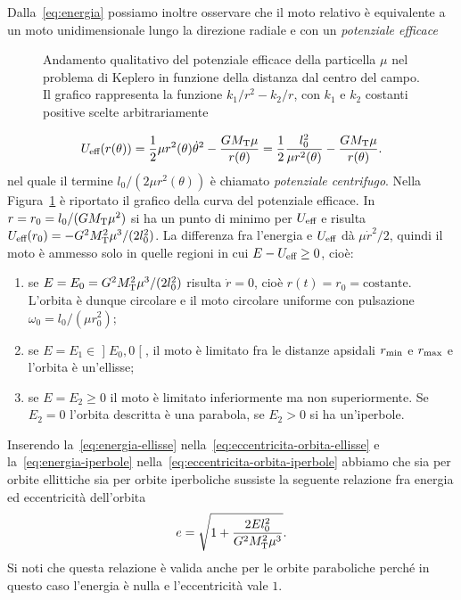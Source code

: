 {Dalla~\eqref{eq:energia} possiamo inoltre osservare che il moto relativo è
equivalente a un moto unidimensionale lungo la direzione radiale e con un
\emph{potenziale efficace}
\begin{figure} %
  \centering
  
  \caption[Andamento del potenziale efficace in funzione della distanza dal
  centro del campo]{Andamento qualitativo del potenziale efficace della
    particella $\mu$ nel problema di Keplero in funzione della distanza dal
    centro del campo. Il grafico rappresenta la funzione $k_1/r^2-k_2/r$, con
    $k_1$ e $k_2$ costanti positive scelte arbitrariamente}
  \label{fig:potenziale-efficace}
\end{figure}
\begin{equation}
  U_\textup{eff}(r(\theta)) = \frac{1}{2}\mu r^2(\theta)\dot{\theta}^2 -
  \frac{GM_\textup{T}\mu}{r(\theta)} = \frac{1}{2}\frac{l_0^2}{\mu r^2(\theta)} -
  \frac{GM_\textup{T}\mu}{r(\theta)}.
\end{equation}
nel quale il termine $l_0/(2\mu r^2(\theta))$ è chiamato \emph{potenziale
  centrifugo}. Nella Figura~\ref{fig:potenziale-efficace} è riportato il grafico
della curva del potenziale efficace. In $r=r_0=l_0/(GM_\textup{T}\mu^2)$ si ha
un punto di minimo per $U_\textup{eff}$ e risulta $U_\textup{eff}(r_0) =
-G^2M_\textup{T}^2\mu^3/(2l_0^2)$. La differenza fra l'energia e
$U_\textup{eff}$ dà $\mu\dot{r}^2/2$, quindi il moto è ammesso solo in quelle
regioni in cui $E-U_\textup{eff}\geq 0$, cioè:
\begin{enumerate}
\item se $E = E_0 = G^2M_\textup{T}^2\mu^3/(2l_0^2)$ risulta $\dot{r}=0$, cioè
  $r(t) = r_0 = \text{costante}$. L'orbita è dunque circolare e il moto
  circolare uniforme con pulsazione $\omega_0 = l_0/(\mu r_0^2)$;
\item se $E = E_1 \in \mathopen{]}E_0,0\mathclose{[}$, il moto è limitato fra le
  distanze apsidali $r_\textup{min}$ e $r_\textup{max}$ e l'orbita è un'ellisse;
\item se $E = E_2 \geq 0$ il moto è limitato inferiormente ma non
  superiormente. Se $E_2 = 0$ l'orbita descritta è una parabola, se $E_2>0$ si
  ha un'iperbole.
\end{enumerate}

Inserendo la~\eqref{eq:energia-ellisse}
nella~\eqref{eq:eccentricita-orbita-ellisse} e la~\eqref{eq:energia-iperbole}
nella~\eqref{eq:eccentricita-orbita-iperbole} abbiamo che sia per orbite
ellittiche sia per orbite iperboliche sussiste la seguente relazione fra energia
ed eccentricità dell'orbita
\begin{equation}
  \label{eq:eccentricita-energia}
  e = \sqrt{1+\frac{2El_0^2}{G^2M_\textup{T}^2\mu^3}}.
\end{equation}
Si noti che questa relazione è valida anche per le orbite paraboliche perché in
questo caso l'energia è nulla e l'eccentricità vale $1$.

}

